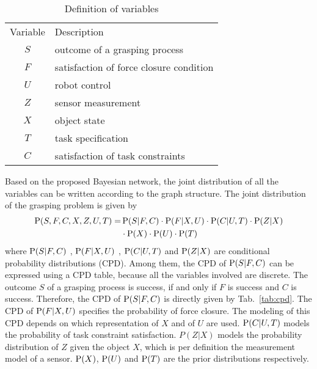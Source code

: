 \begin{table}[!htbp]
\centering
\begin{tabular}{cl}
Variable & Description                              \\
$S$      & outcome of a grasping process            \\
$F$      & satisfaction of force closure condition \\
$U$      & robot control                            \\
$Z$      & sensor measurement                       \\
$X$      & object state                             \\
$T$      & task specification                       \\
$C$      & satisfaction of task constraints       
\end{tabular}
\caption{Definition of variables }
\label{tab:random_variable}
\end{table}

Based on the proposed Bayesian network, the joint distribution of all the variables can be written according to the graph structure. The joint distribution of the grasping problem is given by 
\begin{equation}
\begin{split}
\operatorname*{\text{P}} (S,F,C,X,Z,U,T) = & \operatorname*{\text{P}} (S | F, C )\cdot \operatorname*{\text{P}}(F| X,U) \cdot \operatorname*{\text{P}}(C | U,T) \cdot \operatorname*{\text{P}}(Z|X) \\ 
  &\cdot \operatorname*{\text{P}}(X) \cdot \operatorname*{\text{P}} (U) \cdot \operatorname*{\text{P}}(T)
\end{split}
\label{equ:joint_distribution_grasp}
\end{equation} 
where $\operatorname*{\text{P}} (S | F, C )$ , $\operatorname*{\text{P}}(F| X,U)$ , $\operatorname*{\text{P}}(C | U,T)$ and $\operatorname*{\text{P}}(Z|X)$ are conditional probability distributions (CPD). Among them, the CPD of  $\operatorname*{\text{P}} (S | F, C )$  can be expressed  using a CPD table, because all the variables involved are discrete. The outcome $S$ of a grasping process is success, if and only if $F$ is success and $C$ is success. Therefore, the CPD of $\operatorname*{\text{P}} (S | F, C )$ is directly given by Tab.~\ref{tab:cpd}. The CPD of $\operatorname*{\text{P}}(F|X,U)$ specifies the probability of force closure. The modeling of this CPD depends on which representation of $X$ and of $U$ are used. $\operatorname*{\text{P}}(C | U,T)$ models the probability of task constraint satisfaction.  $P(Z|X) $ models the probability distribution of $Z$ given the object $X$, which is per definition the measurement model of a sensor. $\operatorname*{\text{P}}(X)$, $\operatorname*{\text{P}}(U)$ and $\operatorname*{\text{P}}(T)$ are the prior distributions respectively. 

